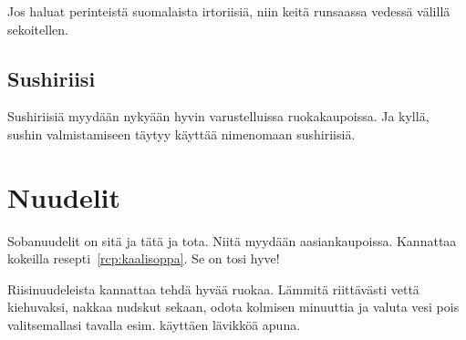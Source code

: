 \documentclass[../keittiokirja.tex]{subfiles}
\begin{document}
Jos haluat perinteistä suomalaista irtoriisiä, niin keitä runsaassa vedessä välillä sekoitellen.

\subsection{Sushiriisi}

Sushiriisiä myydään nykyään hyvin varustelluissa ruokakaupoissa. Ja kyllä, sushin valmistamiseen 
täytyy käyttää nimenomaan sushiriisiä. 


\section{Nuudelit}

Sobanuudelit on sitä ja tätä ja tota. Niitä myydään aasiankaupoissa. 
Kannattaa kokeilla resepti~\ref{rcp:kaalisoppa}. Se on tosi hyve!

Riisinuudeleista kannattaa tehdä hyvää ruokaa. Lämmitä riittävästi vettä kiehuvaksi, nakkaa nudskut 
sekaan, odota kolmisen minuuttia ja valuta vesi pois valitsemallasi tavalla esim. käyttäen lävikköä 
apuna.
\end{document}
